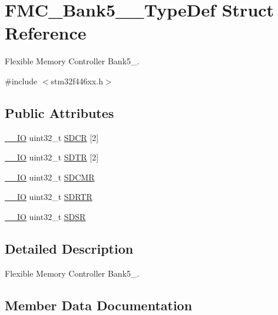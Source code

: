 \hypertarget{struct_f_m_c___bank5__6___type_def}{}\section{F\+M\+C\+\_\+\+Bank5\+\_\+\_\+\+Type\+Def Struct Reference}
\label{struct_f_m_c___bank5__6___type_def}


Flexible Memory Controller Bank5\+\_.  




{\ttfamily \#include $<$stm32f446xx.\+h$>$}

\subsection*{Public Attributes}
\begin{DoxyCompactItemize}
\item 
\hyperlink{core__sc300_8h_aec43007d9998a0a0e01faede4133d6be}{\+\_\+\+\_\+\+IO} uint32\+\_\+t \hyperlink{struct_f_m_c___bank5__6___type_def_a252c4ada37ac883b8e4fe0b08c781d0b}{S\+D\+CR} \mbox{[}2\mbox{]}
\item 
\hyperlink{core__sc300_8h_aec43007d9998a0a0e01faede4133d6be}{\+\_\+\+\_\+\+IO} uint32\+\_\+t \hyperlink{struct_f_m_c___bank5__6___type_def_a8438638391415aaa0dc96714f28915ae}{S\+D\+TR} \mbox{[}2\mbox{]}
\item 
\hyperlink{core__sc300_8h_aec43007d9998a0a0e01faede4133d6be}{\+\_\+\+\_\+\+IO} uint32\+\_\+t \hyperlink{struct_f_m_c___bank5__6___type_def_ad328f49a71561cd3f159af6faf65a641}{S\+D\+C\+MR}
\item 
\hyperlink{core__sc300_8h_aec43007d9998a0a0e01faede4133d6be}{\+\_\+\+\_\+\+IO} uint32\+\_\+t \hyperlink{struct_f_m_c___bank5__6___type_def_ac1887d031d16c1bf2c0a51ee9001f886}{S\+D\+R\+TR}
\item 
\hyperlink{core__sc300_8h_aec43007d9998a0a0e01faede4133d6be}{\+\_\+\+\_\+\+IO} uint32\+\_\+t \hyperlink{struct_f_m_c___bank5__6___type_def_a9f268f86cf706c2c78d8a6a9fbe9d9a3}{S\+D\+SR}
\end{DoxyCompactItemize}


\subsection{Detailed Description}
Flexible Memory Controller Bank5\+\_. 

\subsection{Member Data Documentation}
